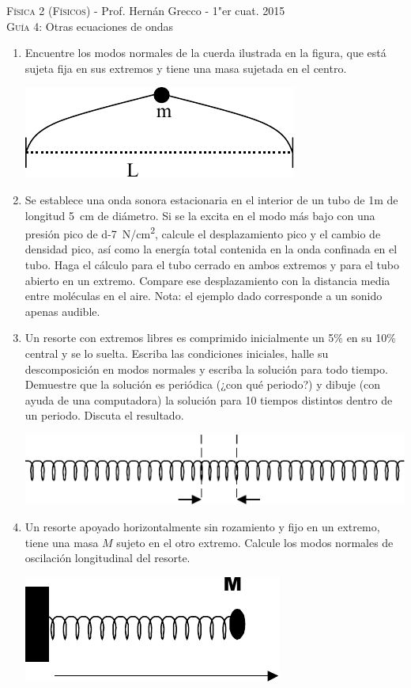 \documentclass[11pt,spanish,a4paper]{article}
\begin{document}
\begin{center}
	\textsc{\large Física 2 (Físicos)} - Prof. Hernán Grecco - 1"er cuat. 2015\\
	\textsc{\large Guía 4:}	Otras ecuaciones de ondas
\end{center}

\begin{enumerate}
\item Encuentre los modos normales de la cuerda ilustrada en la figura, que está sujeta fija en sus extremos y tiene una masa sujetada en el centro.
\begin{center}
	\includegraphics[width=0.25\linewidth]{g04e01}
\end{center}


\item Se establece una onda sonora estacionaria en el interior de un tubo de 1m de longitud \SI{5}{cm} de diámetro.
	Si se la excita en el modo más bajo con una presión pico de \SI{d-7}{N/cm^2}, calcule el desplazamiento pico y el cambio de densidad pico, así como la energía total contenida en la onda confinada en el tubo.
	Haga el cálculo para el tubo cerrado en ambos extremos y para el tubo abierto en un extremo.
	Compare ese desplazamiento con la distancia media entre moléculas en el aire.
	Nota: el ejemplo dado corresponde a un sonido apenas audible.


\item Un resorte con extremos libres es comprimido inicialmente un 5\% en su 10\% central y se lo suelta.
	Escriba las condiciones iniciales, halle su descomposición en modos normales y escriba la solución para todo tiempo.
	Demuestre que la solución es periódica (¿con qué periodo?) y dibuje (con ayuda de una computadora) la solución para 10 tiempos distintos dentro de un periodo.
	Discuta el resultado.
\begin{center}
	\includegraphics[width=0.35\linewidth]{g04e03}
\end{center}


\item Un resorte apoyado horizontalmente sin rozamiento y fijo en un extremo, tiene una masa \(M\) sujeto en el otro extremo.
	Calcule los modos normales de oscilación longitudinal del resorte.
\begin{center}
	\includegraphics[width=0.2\linewidth]{g04e04}
\end{center}



\end{enumerate}
\end{document}
